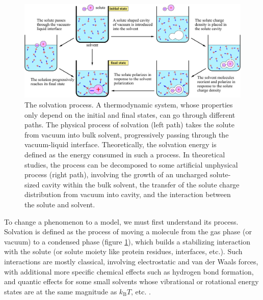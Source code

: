\begin{figure}[h]
\centering{}\textcolor{red}{}%
\begin{minipage}[t]{1\textwidth}%
\begin{center}
\includegraphics[width=1\columnwidth]{_figure/solvation}\caption[The solvation process]{The solvation process.\label{fig:Process-of-solvation} A thermodynamic
system, whose properties only depend on the initial and final states,
can go through different paths. The physical process of solvation
(left path) takes the solute from vacuum into bulk solvent, progressively
passing through the vacuum-liquid interface. Theoretically, the solvation
energy is defined as the energy consumed in such a process. In theoretical
studies, the process can be decomposed to some artificial unphysical
process (right path), involving the growth of an uncharged solute-sized
cavity within the bulk solvent, the transfer of the solute charge
distribution from vacuum into cavity, and the interaction between
the solute and solvent.}

\par\end{center}%
\end{minipage}
\end{figure}


To change a phenomenon to a model, we must first understand its process.
Solvation is defined as the process of moving a molecule from the
gas phase (or vacuum) to a condensed phase (figure \ref{fig:Process-of-solvation}),
which builds a stabilizing interaction with the solute (or solute
moiety like protein residues, interfaces, etc.). Such interactions
are mostly classical, involving electrostatic and van der Waals forces,
with additional more specific chemical effects such as hydrogen bond
formation, and quantic effects for some small solvents whose vibrational
or rotational energy states are at the same magnitude as $k_{\mathrm{B}}T$,
etc. \citep{Gray-Gubbins,iupac}.

